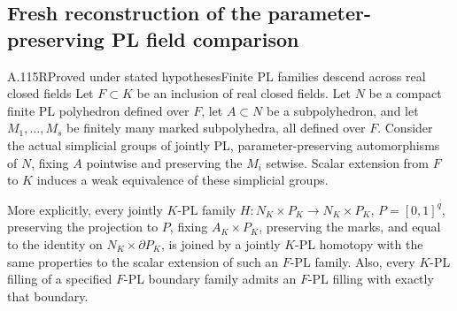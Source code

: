 \subsection{Fresh reconstruction of the parameter-preserving PL field comparison}

\begin{saresult}{A.115R}{Proved under stated hypotheses}{Finite PL families descend across real closed fields}
Let \(F\subset K\) be an inclusion of real closed fields. Let \(N\) be a compact finite PL polyhedron defined over \(F\), let \(A\subset N\) be a subpolyhedron, and let \(M_1,\ldots,M_s\) be finitely many marked subpolyhedra, all defined over \(F\). Consider the actual simplicial groups of jointly PL, parameter-preserving automorphisms of \(N\), fixing \(A\) pointwise and preserving the \(M_i\) setwise. Scalar extension from \(F\) to \(K\) induces a weak equivalence of these simplicial groups.

More explicitly, every jointly \(K\)-PL family \(H:N_K\times P_K\to N_K\times P_K\), \(P=[0,1]^q\), preserving the projection to \(P\), fixing \(A_K\times P_K\), preserving the marks, and equal to the identity on \(N_K\times\partial P_K\), is joined by a jointly \(K\)-PL homotopy with the same properties to the scalar extension of such an \(F\)-PL family. Also, every \(K\)-PL filling of a specified \(F\)-PL boundary family admits an \(F\)-PL filling with exactly that boundary.
\end{saresult}

